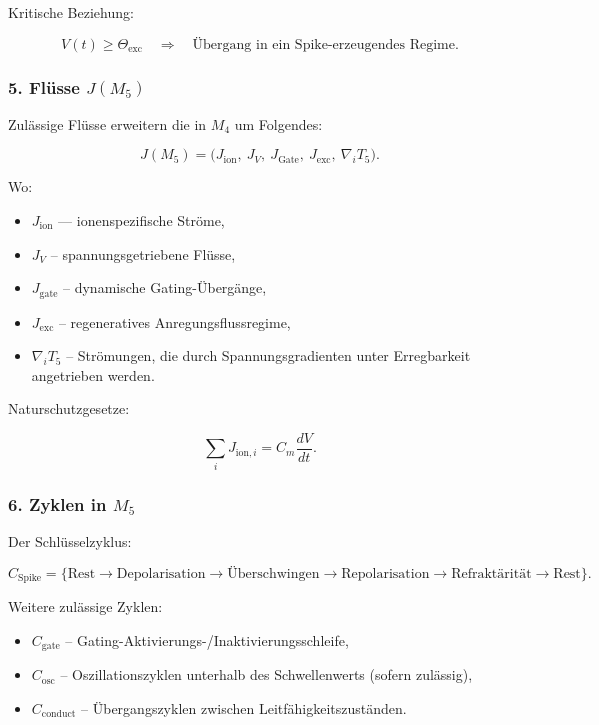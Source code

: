 Kritische Beziehung:

\[
V(t) \ge \Theta_{\mathrm{exc}} \quad\Rightarrow\quad
\text{Übergang in ein Spike-erzeugendes Regime}.
\]

\subsubsection*{5. Flüsse \texorpdfstring{$J(M_5)$}{J(M_5)}}

Zulässige Flüsse erweitern die in $M_4$ um Folgendes:

\[
J(M_5) =
\big(
J_{\mathrm{ion}},\
J_V,\
J_{\mathrm{Gate}},\
J_{\mathrm{exc}},\
\nabla_i T_5
\Big).
\]

Wo:

\begin{itemize}
    \item $J_{\mathrm{ion}}$ — ionenspezifische Ströme,
    \item $J_V$ – spannungsgetriebene Flüsse,
    \item $J_{\mathrm{gate}}$ – dynamische Gating-Übergänge,
    \item $J_{\mathrm{exc}}$ – regeneratives Anregungsflussregime,
    \item $\nabla_i T_5$ – Strömungen, die durch Spannungsgradienten unter Erregbarkeit angetrieben werden.
\end{itemize}

Naturschutzgesetze:

\[
\sum_i J_{\mathrm{ion},i} = C_m \frac{dV}{dt}.
\]

\subsubsection*{6. Zyklen in \texorpdfstring{$M_5$}{M_5}}

Der Schlüsselzyklus:

\[
C_{\mathrm{Spike}}
=
\{\text{Rest} \to \text{Depolarisation} \to
\text{Überschwingen} \to \text{Repolarisation} \to \text{Refraktärität} \to \text{Rest}\}.
\]

Weitere zulässige Zyklen:

\begin{itemize}
    \item $C_{\mathrm{gate}}$ – Gating-Aktivierungs-/Inaktivierungsschleife,
    \item $C_{\mathrm{osc}}$ – Oszillationszyklen unterhalb des Schwellenwerts (sofern zulässig),
    \item $C_{\mathrm{conduct}}$ – Übergangszyklen zwischen Leitfähigkeitszuständen.
\end{itemize}


